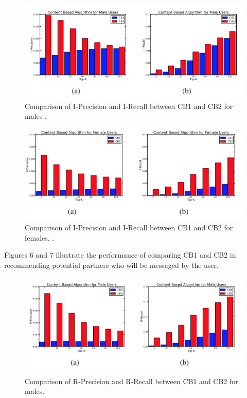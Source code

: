 \documentclass[11pt]{article}
\begin{document}
\begin{figure}[h]
\begin{center}
\includegraphics{i_male.png} 
\caption{Comparison of I-Precision and I-Recall between CB1 and CB2 for males \cite{recip}.} 
\end{center}
\end{figure}

\begin{figure}[h]
\begin{center}
\includegraphics{i_female.png} 
\caption{Comparison of I-Precision and I-Recall between CB1 and CB2 for females. \cite{recip}.} 
\end{center}
\end{figure}

Figures 6 and 7 illustrate the performance of comparing CB1 and CB2 in recommending potential partners who will be messaged by the user.


\begin{figure}[h]
\begin{center}
\includegraphics{r_male.png} 
\caption{Comparison of R-Precision and R-Recall between CB1 and CB2 for males\cite{recip}.} 
\end{center}
\end{figure}
\end{document}

